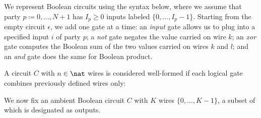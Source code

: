 We represent Boolean circuits using the syntax below, where we assume that party $p \coloneqq 0,\ldots,N+1$ has $I_p \geq 0$ inputs labeled $\{0,\ldots,I_p-1\}$. Starting from the empty circuit $\epsilon$, we add one gate at a time: an \emph{input} gate allows us to plug into a specified input $i$ of party $p$; a \emph{not} gate negates the value carried on wire $k$; an \emph{xor} gate computes the Boolean sum of the two values carried on wires $k$ and $l$; and an \emph{and} gate does the same for Boolean product.

\begin{syntax}
	
    \alternative{\epsilon}
\end{syntax}

\noindent A circuit $C$ with $n \in \nat$ wires is considered well-formed if each logical gate combines previously defined wires only:


\noindent We now fix an ambient Boolean circuit $C$ with $K$ wires $\{0,\ldots,K-1\}$, a subset of which is designated as outputs.

